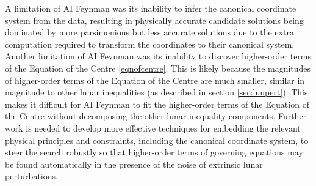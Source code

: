 \documentclass[fleqn,10pt]{olplainarticle}
\numberwithin{equation}{subsection}
\begin{document}

A limitation of AI Feynman was its inability to infer the canonical coordinate system from the data, resulting in physically accurate candidate solutions being dominated by more parsimonious but less accurate solutions due to the extra computation required to transform the coordinates to their canonical system. Another limitation of AI Feynman was its inability to discover higher-order terms of the Equation of the Centre \eqref{eqnofcentre}. This is likely because the magnitudes of higher-order terms of the Equation of the Centre are much smaller, similar in magnitude to other lunar inequalities (as described in section \ref{sec:lunpert}). This makes it difficult for AI Feynman to fit the higher-order terms of the Equation of the Centre without decomposing the other lunar inequality components. Further work is needed to develop more effective techniques for embedding the relevant physical principles and constraints, including the canonical coordinate system, to steer the search robustly so that higher-order terms of governing equations may be found automatically in the presence of the noise of extrinsic lunar perturbations.

\newpage
\nocite{*}

\end{document}
